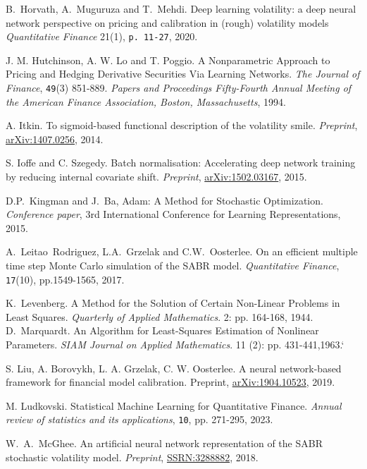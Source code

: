 \documentclass{article}
\theoremstyle{remark}
\begin{document}
\begin{thebibliography}{99}
B.~Horvath,  A.~Muguruza and T.~Mehdi.
Deep learning volatility: a deep neural network perspective on pricing and calibration in (rough) volatility models
\textit{Quantitative Finance} 21(1), {\tt p. 11-27}, 2020.

J. M. Hutchinson, A. W. Lo and T. Poggio.
A Nonparametric Approach to Pricing and Hedging Derivative Securities Via Learning Networks.
\textit{The Journal of Finance}, {\tt 49}(3) 851-889. \textit{Papers and Proceedings Fifty-Fourth Annual Meeting of the American Finance Association, Boston, Massachusetts}, 1994.

 A. Itkin.
To sigmoid-based functional description of the volatility smile.
\textit{Preprint}, \href{https://arxiv.org/pdf/1407.0256.pdf}{arXiv:1407.0256}, 2014. 

S. Ioffe and C. Szegedy.
Batch normalisation: Accelerating deep network training by reducing internal covariate shift. \textit{Preprint}, \href{https://arxiv.org/abs/1502.03167}{arXiv:1502.03167}, 2015.

 D.P.~Kingman and J.~Ba, Adam: A Method for Stochastic Optimization. \textit{Conference paper}, 3rd International Conference for Learning Representations, 2015.

 A.~Leitao~Rodriguez, L.A.~Grzelak and C.W.~Oosterlee. On an efficient multiple time step Monte Carlo simulation of the SABR model. \textit{Quantitative Finance}, {\tt 17}(10), pp.1549-1565, 2017.

 K.~Levenberg. A Method for the Solution of Certain Non-Linear Problems in Least Squares. \textit{Quarterly of Applied Mathematics}. 2: pp. 164-168, 1944.
 D.~Marquardt. An Algorithm for Least-Squares Estimation of Nonlinear Parameters. \textit{SIAM Journal on Applied Mathematics}. 11 (2): pp. 431-441,1963.`

 S. Liu, A. Borovykh, L. A. Grzelak, C. W. Oosterlee.
A neural network-based framework for financial model calibration.
Preprint, \href{https://arxiv.org/abs/1904.10523}{arXiv:1904.10523}, 2019.

 M. Ludkovski.
Statistical Machine Learning for Quantitative Finance.
\textit{Annual review of statistics and its applications}, {\tt 10}, pp. 271-295, 2023.

W.~A.~McGhee. An artificial neural network representation of the SABR stochastic volatility model. \textit{Preprint}, \href{https://ssrn.com/abstract=3288882}{SSRN:3288882}, 2018.


\end{thebibliography}
\end{document}
